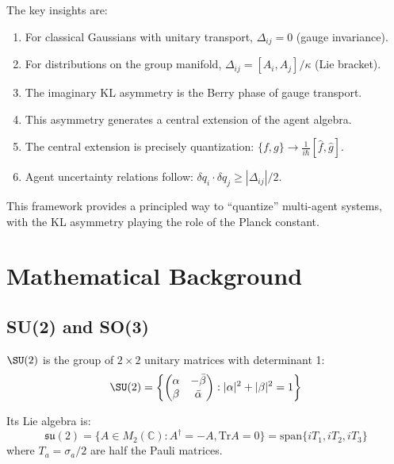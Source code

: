 \documentclass[11pt,a4paper]{article}
\newcommand{\Tr}{\mathrm{Tr}}
\newcommand{\C}{\mathbb{C}}
\begin{document}
The key insights are:

\begin{enumerate}
    \item For classical Gaussians with unitary transport, $\Delta_{ij} = 0$ (gauge invariance).

    \item For distributions on the group manifold, $\Delta_{ij} = [A_i, A_j]/\kappa$ (Lie bracket).

    \item The imaginary KL asymmetry is the Berry phase of gauge transport.

    \item This asymmetry generates a central extension of the agent algebra.

    \item The central extension is precisely quantization: $\{f,g\} \to \frac{1}{i\hbar}[\hat{f}, \hat{g}]$.

    \item Agent uncertainty relations follow: $\delta q_i \cdot \delta q_j \geq |\Delta_{ij}|/2$.
\end{enumerate}

This framework provides a principled way to ``quantize'' multi-agent systems, with the KL asymmetry playing the role of the Planck constant.

\appendix
\section{Mathematical Background}

\subsection{SU(2) and SO(3)}

$\SU(2)$ is the group of $2 \times 2$ unitary matrices with determinant 1:
\begin{equation}
    \SU(2) = \left\{ \begin{pmatrix} \alpha & -\bar{\beta} \\ \beta & \bar{\alpha} \end{pmatrix} : |\alpha|^2 + |\beta|^2 = 1 \right\}
\end{equation}

Its Lie algebra is:
\begin{equation}
    \mathfrak{su}(2) = \{A \in M_2(\C) : A^\dagger = -A, \Tr A = 0\} = \text{span}\{iT_1, iT_2, iT_3\}
\end{equation}
where $T_a = \sigma_a/2$ are half the Pauli matrices.
\end{document}
